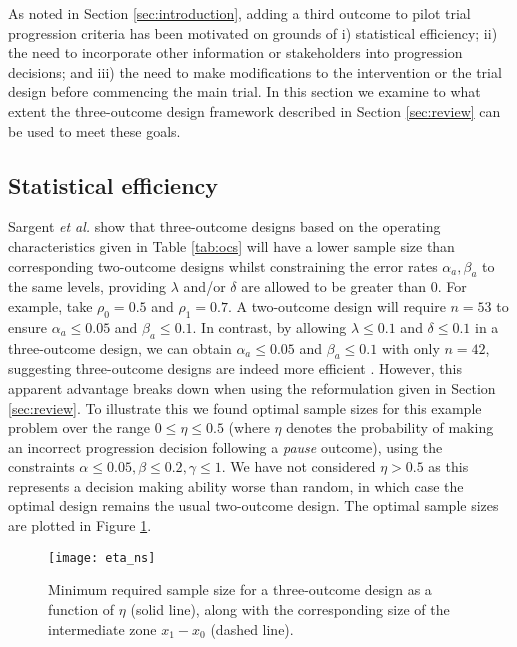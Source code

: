 \documentclass[referee, lineno, pdflatex,sn-vancouver,Numbered]{sn-jnl}%
\theoremstyle{thmstyleone}%
\theoremstyle{thmstyletwo}%
\theoremstyle{thmstylethree}%
\begin{document}
As noted in Section \ref{sec:introduction}, adding a third outcome to pilot trial progression criteria has been motivated on grounds of i) statistical efficiency; ii) the need to incorporate other information or stakeholders into progression decisions; and iii) the need to make modifications to the intervention or the trial design before commencing the main trial. In this section we examine to what extent the three-outcome design framework described in Section \ref{sec:review} can be used to meet these goals.

\subsection{Statistical efficiency}\label{sec:efficiency}

Sargent \emph{et al.} show that three-outcome designs based on the operating characteristics given in Table \ref{tab:ocs} will have a lower sample size than corresponding two-outcome designs whilst constraining the error rates $\alpha_a, \beta_a$ to the same levels, providing $\lambda$ and/or $\delta$ are allowed to be greater than 0. For example, take $\rho_0 = 0.5$ and $\rho_1 = 0.7$. A two-outcome design will require $n = 53$ to ensure $\alpha_a \leq 0.05$ and $\beta_a \leq 0.1$. In contrast, by allowing $\lambda \leq 0.1$ and $\delta \leq 0.1$ in a three-outcome design, we can obtain $\alpha_a \leq 0.05$ and $\beta_a \leq 0.1$ with only $n = 42$, suggesting three-outcome designs are indeed more efficient \cite{Sargent2001, Hong2007}. However, this apparent advantage breaks down when using the reformulation given in Section \ref{sec:review}. To illustrate this we found optimal sample sizes for this example problem over the range $0 \leq \eta \leq 0.5$ (where $\eta$ denotes the probability of making an incorrect progression decision following a \emph{pause} outcome), using the constraints $\alpha \leq 0.05, \beta \leq 0.2, \gamma \leq 1$. We have not considered $\eta > 0.5$ as this represents a decision making ability worse than random, in which case the optimal design remains the usual two-outcome design. The optimal sample sizes are plotted in Figure \ref{fig:eta_ns}.

\begin{figure}
\centering
\texttt{[image: eta\_ns]}
\caption{Minimum required sample size for a three-outcome design as a function of $\eta$ (solid line), along with the corresponding size of the intermediate zone $x_1 - x_0$ (dashed line).}
\label{fig:eta_ns}
\end{figure}
\end{document}

